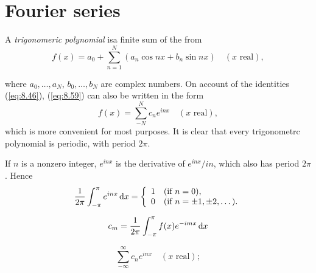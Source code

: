 \section{Fourier series}
\begin{mydef}
    \label{mydef:8.9}
    A \emph{trigonomeric polynomial} isa finite sum of the from 
    \begin{equation}
        \label{eq:8.59}
        f(x) = a_0 + \sum_{n=1}^{N}(a_n \cos n x + b_n \sin n x)
        \quad (x \text{ real}),
    \end{equation}
\end{mydef}
where $a_0,\dots,a_N$, $b_0,\dots,b_N$ are complex numbers.
On account of the identities (\ref{eq:8.46}),
(\ref{eq:8.59}) can also be written in the form 
\begin{equation}
    \label{eq:8.60}
    f(x) = \sum_{-N}^{N} c_n e^{inx}
    \quad (x \text{ real}),
\end{equation}
which is more convenient for most purposes.
It is clear that every trigonometrc polynomial is periodic, with period $2\pi$.

If $n$ is a nonzero integer, $e^{inx}$ is the derivative of $e^{inx}/in$,
which also has period $2\pi$. Hence
\begin{equation}
    \label{eq:8.61}
    \frac{1}{2\pi}\int_{-\pi}^{\pi}e^{inx} \d x  =
    \left\{ 
        \begin{array}{ll}
            1 & (\text{if } n = 0), \\
            0 & (\text{if } n = \pm 1, \pm 2, \dots). \\
        \end{array}
     \right.
\end{equation}

\begin{equation}
    \label{eq:8.62}
    c_m = \frac{1}{2\pi} \int_{-\pi}^{\pi} f(x) e^{-imx} \d x
\end{equation}

\begin{equation}
    \label{eq:8.63}
    \sum_{-\infty}^{\infty} c_n e^{inx} 
    \quad 
    (x \text{ real});
\end{equation}


